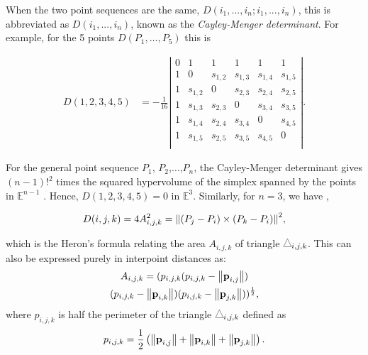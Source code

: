 When the two point sequences are the same, $D(i_1,...,i_n;i_1,...,i_n)$, this is abbreviated as $D(i_1,...,i_n)$, known as the \textit{Cayley-Menger determinant}. For example, for the 5 points $D(P_1,\ldots,P_5)$ this is

\small
\begin{equation}
    \begin{split}
    D(1,2,3,4,5)&=-\frac{1}{16}\left| \begin{array}{cccccc}
                0   &   1         & 1       & 1       & 1       & 1       \\
                1   &   0         & s_{1,2} & s_{1,3} & s_{1,4} & s_{1,5} \\
                1   &   s_{1,2}   & 0       & s_{2,3} & s_{2,4} & s_{2,5} \\
                1   &   s_{1,3}   & s_{2,3} & 0       & s_{3,4} & s_{3,5} \\
                1   &   s_{1,4}   & s_{2,4} & s_{3,4} & 0       & s_{4,5} \\
                1   &   s_{1,5}   & s_{2,5} & s_{3,5} & s_{4,5} & 0       \\
                \end{array} \right|.%
    \end{split}
    \label{eq-CMD}
\end{equation}
\normalsize

For the general point sequence $P_{1}$, $P_{2}$,$\ldots$,$P_{n}$, the Cayley-Menger determinant gives $(n-1)!^2$ times the squared hypervolume of the simplex spanned by the points in $\mathbb{E}^{n-1}$ \cite{Menger}. Hence, $D(1,2,3,4,5) = 0$ in $\mathbb{E}^3$. Similarly, for $n=3$, we have \cite{thomas2005revisiting}, 

\begin{equation}
    D(i,j,k)=4A_{i,j,k}^2=\norm{(P_j-P_i)\times(P_k-P_i)}^2,
    \label{eq1}
\end{equation}

which is the Heron's formula relating the area $A_{i,j,k}$ of triangle $\ppp_{i,j,k}$. This can also be expressed purely in interpoint distances as:
\begin{multline}
    A_{i,j,k}=(p_{i,j,k}(p_{i,j,k}-\norm{\textbf{p}_{i,j}})\\(p_{i,j,k}-\norm{\textbf{p}_{i,k}})(p_{i,j,k}-\norm{\textbf{p}_{j,k}}))^\frac{1}{2},
    \label{eq-tri-area}
\end{multline}
where $p_{i,j,k}$ is half the perimeter of the triangle $\ppp_{i,j,k}$ defined as
\begin{equation}
    p_{i,j,k}=\frac{1}{2}\left(\norm{\textbf{p}_{i,j}}+\norm{\textbf{p}_{i,k}}+\norm{\textbf{p}_{j,k}}\right).
\end{equation}

